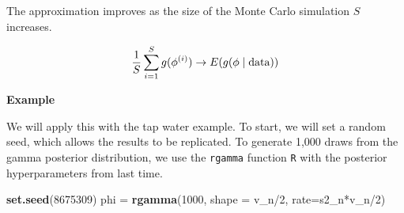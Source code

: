 \documentclass[]{book}
\newenvironment{Shaded}{\begin{snugshade}}{\end{snugshade}}
\newcommand{\KeywordTok}[1]{\textcolor[rgb]{0.13,0.29,0.53}{\textbf{{#1}}}}
\newcommand{\DataTypeTok}[1]{\textcolor[rgb]{0.13,0.29,0.53}{{#1}}}
\newcommand{\DecValTok}[1]{\textcolor[rgb]{0.00,0.00,0.81}{{#1}}}
\newcommand{\FloatTok}[1]{\textcolor[rgb]{0.00,0.00,0.81}{{#1}}}
\newcommand{\StringTok}[1]{\textcolor[rgb]{0.31,0.60,0.02}{{#1}}}
\newcommand{\NormalTok}[1]{{#1}}
\theoremstyle{definition}
\theoremstyle{definition}
\theoremstyle{definition}
\theoremstyle{remark}
\begin{document}
The approximation improves as the size of the Monte Carlo simulation
\(S\) increases.

\[\frac{1}{S}\sum^S_{i=1}g(\phi^{(i)}) \rightarrow E(g(\phi \mid \text{data}))\]

\textbf{Example}

We will apply this with the tap water example. To start, we will set a
random seed, which allows the results to be replicated. To generate
1,000 draws from the gamma posterior distribution, we use the
\texttt{rgamma} function \texttt{R} with the posterior hyperparameters
from last time.

\begin{Shaded}
\end{Shaded}

\begin{Shaded}
\begin{Highlighting}[]
\KeywordTok{set.seed}\NormalTok{(}\DecValTok{8675309}\NormalTok{)}
\NormalTok{phi =}\StringTok{ }\KeywordTok{rgamma}\NormalTok{(}\DecValTok{1000}\NormalTok{, }\DataTypeTok{shape =} \NormalTok{v_n/}\DecValTok{2}\NormalTok{, }\DataTypeTok{rate=}\NormalTok{s2_n*v_n/}\DecValTok{2}\NormalTok{)}
\end{Highlighting}
\end{Shaded}
\end{document}
